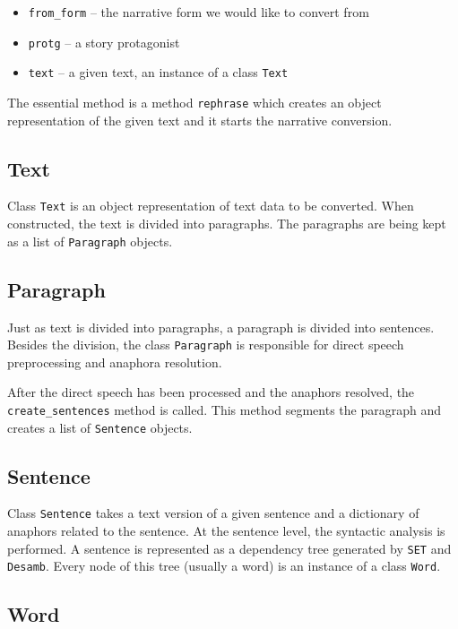 \begin{itemize}
	\item \texttt{from\_form} -- the narrative form we would like to convert from
	\item \texttt{protg} -- a story protagonist
	\item \texttt{text} -- a given text, an instance of a class \texttt{Text}
\end{itemize}

The essential method is a method \texttt{rephrase} which creates an object representation of the given text and it starts the narrative conversion.

\subsection{Text}

Class \texttt{Text} is an object representation of text data to be converted. When constructed, the text is divided into paragraphs. The paragraphs are being kept as a list of \texttt{Paragraph} objects.

\subsection{Paragraph}

Just as text is divided into paragraphs, a paragraph is divided into sentences. Besides the division, the class \texttt{Paragraph} is responsible for direct speech preprocessing and anaphora resolution.

After the direct speech has been processed and the anaphors resolved, the \texttt{create\_sentences} method is called. This method segments the paragraph and creates a list of \texttt{Sentence} objects.

\subsection{Sentence}

Class \texttt{Sentence} takes a text version of a given sentence and a dictionary of anaphors related to the sentence. At the sentence level, the syntactic analysis is performed. A sentence is represented as a dependency tree generated by \texttt{SET} and \texttt{Desamb}. Every node of this tree (usually a word) is an instance of a class \texttt{Word}.

\subsection{Word}

